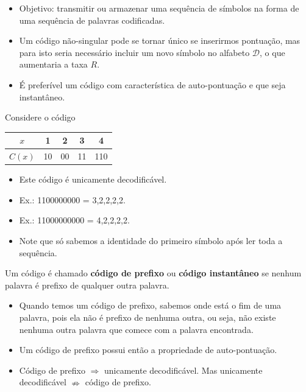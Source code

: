 \begin{frame}[allowframebreaks]
  \begin{itemize}
  \item Objetivo: transmitir ou armazenar uma sequência de símbolos na forma de uma sequência de palavras codificadas.
  \item Um código não-singular pode se tornar único se inserirmos pontuação, mas para isto seria necessário incluir
	um novo símbolo no alfabeto $\mathcal{D}$, o que aumentaria a taxa $R$.
  \item É preferível um código com característica de auto-pontuação e que seja instantâneo.
  \end{itemize}

  \framebreak

  Considere o código

  \begin{center}
  \begin{tabular}{ccccc}
  $x$    & 1  & 2  & 3  & 4 \\ \hline
  $C(x)$ & 10 & 00 & 11 & 110
  \end{tabular}
  \end{center}

  \begin{itemize}
  \item Este código é unicamente decodificável.
  \item Ex.: 1100000000 = 3,2,2,2,2.
  \item Ex.: 11000000000 = 4,2,2,2,2.
  \item Note que só sabemos a identidade do primeiro símbolo após ler toda a sequência.
  \end{itemize}

  \framebreak

  \begin{definition}
  Um código é chamado \textbf{código de prefixo} ou \textbf{código instantâneo} se nenhum palavra
  é prefixo de qualquer outra palavra.
  \end{definition}

  \begin{itemize}
  \item Quando temos um código de prefixo, sabemos onde está o fim de uma palavra, pois ela não
	é prefixo de nenhuma outra, ou seja, não existe nenhuma outra palavra que comece com a palavra
	encontrada.
  \item Um código de prefixo possui então a propriedade de auto-pontuação.
  \item Código de prefixo $\Rightarrow$ unicamente decodificável. 
	Mas unicamente decodificável $\nRightarrow$ código de prefixo.
  \end{itemize}
 

\end{frame}
